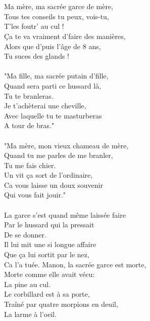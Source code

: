 \\\\Ma mère, ma sacrée garce de mère,
\\Tous tes conseils tu peux, vois-tu, 
\\T'les foutr' au cul !
\\Ça te va vraiment d'faire des manières,
\\Alors que d'puis l'âge de 8 ans,
\\Tu suces des glands !
\\\\"Ma fille, ma sacrée putain d'fille,
\\Quand sera parti ce hussard là,
\\Tu te branleras.
\\Je t'achèterai une cheville,
\\Avec laquelle tu te masturberas
\\A tour de bras."
\\\\"Ma mère, mon vieux chameau de mère,
\\Quand tu me parles de me branler,
\\Tu me fais chier.
\\Un vit ça sort de l'ordinaire,
\\Ca vous laisse un doux souvenir
\\Qui vous fait jouir."
\\\\La garce s'est quand même laissée faire
\\Par le hussard qui la pressait
\\De se donner.
\\Il lui mit une si longue affaire
\\Que ça lui sortit par le nez,
\\Ca l'a tuée.
\breakpage
Manon, la sacrée garce est morte,
\\Morte comme elle avait vécu:
\\La pine au cul.
\\Le corbillard est à sa porte,
\\Traîné par quatre morpions en deuil,
\\La larme à l'oeil.
